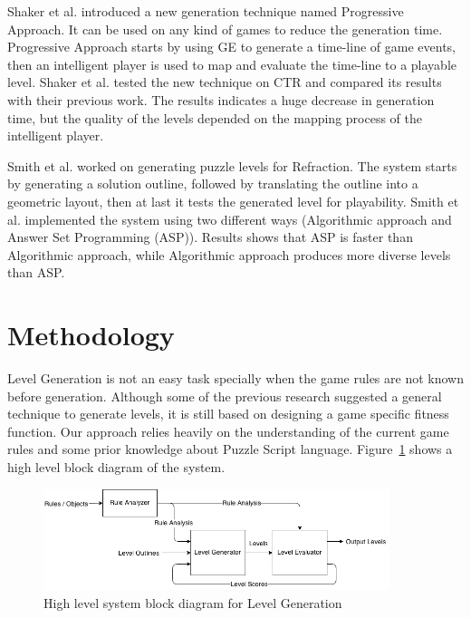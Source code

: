 \documentclass[letterpaper]{article}
\newcommand{\figref}[1]{Figure~\ref{Figure:#1}}
\begin{document}
Shaker et al.\cite{ctrProgressiveApproach} introduced a new generation technique named Progressive Approach. It can be used on any kind of games to reduce the generation time. Progressive Approach starts by using GE to generate a time-line of game events, then an intelligent player is used to map and evaluate the time-line to a playable level. Shaker et al. tested the new technique on CTR and compared its results with their previous work\cite{ctrSimulationApproach}. The results indicates a huge decrease in generation time, but the quality of the levels depended on the mapping process of the intelligent player.\\\par

Smith et al.\cite{refractionStudy} worked on generating puzzle levels for Refraction\cite{refraction}. The system starts by generating a solution outline, followed by translating the outline into a geometric layout, then at last it tests the generated level for playability. Smith et al. implemented the system using two different ways (Algorithmic approach and Answer Set Programming (ASP)). Results shows that ASP is faster than Algorithmic approach, while Algorithmic approach produces more diverse levels than ASP.

\section{Methodology}
Level Generation is not an easy task specially when the game rules are not known before generation. Although some of the previous research suggested a general technique to generate levels, it is still based on designing a game specific fitness function. Our approach relies heavily on the understanding of the current game rules and some prior knowledge about Puzzle Script language. \figref{levelGenBlockDiagram} shows a high level block diagram of the system.\\\par

\begin{figure}[ht]
  	\centering
    \includegraphics[width=0.9\textwidth]{Images/levelGenBlockDiagram}
    \caption{High level system block diagram for Level Generation}
    \label{Figure:levelGenBlockDiagram}
\end{figure}
\end{document}
